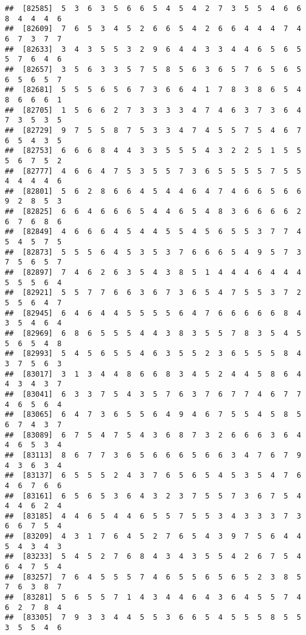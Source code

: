\documentclass[
]{book}
\begin{document}
\begin{verbatim}
##  [82585]  5  3  6  3  5  6  6  5  4  5  4  2  7  3  5  5  4  6  6  8  4  4  4  6
##  [82609]  7  6  5  3  4  5  2  6  6  5  4  2  6  6  4  4  4  7  4  6  7  3  7  7
##  [82633]  3  4  3  5  5  3  2  9  6  4  4  3  3  4  4  6  5  6  5  5  7  6  4  6
##  [82657]  3  5  6  3  3  5  7  5  8  5  6  3  6  5  7  6  5  6  5  6  5  6  5  7
##  [82681]  5  5  5  6  5  6  7  3  6  6  4  1  7  8  3  8  6  5  4  8  6  6  6  1
##  [82705]  1  5  6  6  2  7  3  3  3  3  4  7  4  6  3  7  3  6  4  7  3  5  3  5
##  [82729]  9  7  5  5  8  7  5  3  3  4  7  4  5  5  7  5  4  6  7  6  5  4  3  5
##  [82753]  6  6  6  8  4  4  3  3  5  5  5  4  3  2  2  5  1  5  5  5  6  7  5  2
##  [82777]  4  6  6  4  7  5  3  5  5  7  3  6  5  5  5  5  7  5  5  4  4  4  4  6
##  [82801]  5  6  2  8  6  6  4  5  4  4  6  4  7  4  6  6  5  6  6  9  2  8  5  3
##  [82825]  6  6  4  6  6  6  5  4  4  6  5  4  8  3  6  6  6  6  2  6  7  6  8  6
##  [82849]  4  6  6  6  4  5  4  4  5  5  4  5  6  5  5  3  7  7  4  5  4  5  7  5
##  [82873]  5  5  5  6  4  5  3  5  3  7  6  6  6  5  4  9  5  7  3  7  5  6  5  7
##  [82897]  7  4  6  2  6  3  5  4  3  8  5  1  4  4  4  6  4  4  4  5  5  5  6  4
##  [82921]  5  5  7  7  6  6  3  6  7  3  6  5  4  7  5  5  3  7  2  5  5  6  4  7
##  [82945]  6  4  6  4  4  5  5  5  5  6  4  7  6  6  6  6  6  8  4  3  5  4  6  4
##  [82969]  6  8  6  5  5  5  4  4  3  8  3  5  5  7  8  3  5  4  5  5  6  5  4  8
##  [82993]  5  4  5  6  5  5  4  6  3  5  5  2  3  6  5  5  5  8  4  3  7  5  6  3
##  [83017]  3  1  3  4  4  8  6  6  8  3  4  5  2  4  4  5  8  6  4  4  3  4  3  7
##  [83041]  6  3  3  7  5  4  3  5  7  6  3  7  6  7  7  4  6  7  7  4  6  5  6  4
##  [83065]  6  4  7  3  6  5  5  6  4  9  4  6  7  5  5  4  5  8  5  6  7  4  3  7
##  [83089]  6  7  5  4  7  5  4  3  6  8  7  3  2  6  6  6  3  6  4  4  6  5  3  4
##  [83113]  8  6  7  7  3  6  5  6  6  6  5  6  6  3  4  7  6  7  9  4  3  6  3  4
##  [83137]  6  5  5  5  2  4  3  7  6  5  6  5  4  5  3  5  4  7  6  4  6  7  6  6
##  [83161]  6  5  6  5  3  6  4  3  2  3  7  5  5  7  3  6  7  5  4  4  4  6  2  4
##  [83185]  4  4  6  5  4  4  6  5  5  7  5  5  3  4  3  3  3  7  3  6  6  7  5  4
##  [83209]  4  3  1  7  6  4  5  2  7  6  5  4  3  9  7  5  6  4  4  5  4  3  4  3
##  [83233]  5  4  5  2  7  6  8  4  3  4  3  5  5  4  2  6  7  5  4  6  4  7  5  4
##  [83257]  7  6  4  5  5  5  7  4  6  5  5  6  5  6  5  2  3  8  5  7  6  3  8  7
##  [83281]  5  6  5  5  7  1  4  3  4  4  6  4  3  6  4  5  5  7  4  6  2  7  8  4
##  [83305]  7  9  3  3  4  4  5  5  3  6  6  5  4  5  5  5  8  5  5  3  5  5  4  6

\end{verbatim}
\end{document}

